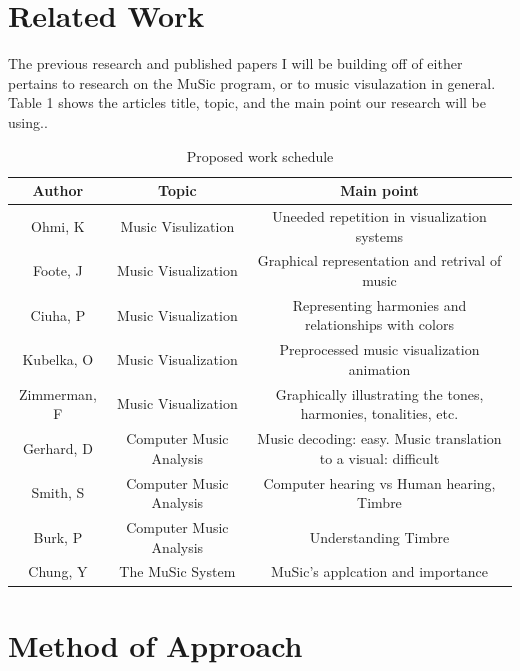 \documentclass[11pt]{article}
\begin{document}
\vspace*{-.1in}
\section{Related Work}
\label{sec:relatedwork}
\vspace*{-.1in}


The previous research and published papers I will be building off of either pertains to research on the MuSic program, or to music visulazation in general. Table 1 shows the articles title, topic, and the main point our research will be using.\cite{conrad-gecco-selection-study}.
\begin{table}[htbp]
\centering
\begin{tabular}{|c||c|c|}
\hline
\bf Author & \bf Topic & \bf Main point\\\hline\hline
Ohmi, K & Music Visulization & Uneeded repetition in visualization systems\\\hline
Foote, J & Music Visualization & Graphical representation and retrival of music\\\hline
Ciuha, P & Music Visualization & Representing harmonies and relationships with colors\\\hline
Kubelka, O & Music Visualization & Preprocessed music visualization animation\\\hline
Zimmerman, F & Music Visualization & Graphically illustrating the tones, harmonies, tonalities, etc.\\\hline
Gerhard, D & Computer Music Analysis & Music decoding: easy. Music translation to a visual: difficult\\\hline
Smith, S & Computer Music Analysis & Computer hearing vs Human hearing, Timbre\\\hline
Burk, P & Computer Music Analysis & Understanding Timbre\\\hline
Chung, Y & The MuSic System & MuSic's applcation and importance\\\hline
\end{tabular}
\caption{Proposed work schedule}
\label{intro-tab1}
\end{table}

\vspace*{-.2in}
\section{Method of Approach}
\label{sec:method}
\vspace*{-.1in}
\end{document}

